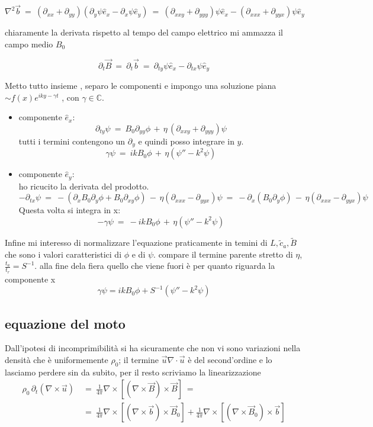 \[\nabla^2\vec b\ =\ (\partial_{xx}+\partial_{yy})(\partial_y\psi\hat e_x-\partial_x\psi\hat e_y)\ =\ (\partial_{xxy}+\partial_{yyy})\psi\hat e_x-(\partial_{xxx}+\partial_{yyx})\psi\hat e_y\] 

chiaramente la derivata rispetto al tempo del campo elettrico mi ammazza il campo medio $B_0$ 

\[\partial_t\vec B\ =\ \partial _t\vec b\ =\ \partial_{ty}\psi\hat e_x-\partial_{tx}\psi\hat e_y\]

Metto tutto insieme , separo le componenti e impongo una soluzione piana $\sim f(x)e^{iky-\gamma t}$ , con $\gamma \in \mathbb C$.

\begin{itemize}
	\item componente $\hat e_x$:\[ \partial_{ty}\psi\ =\ B_0\partial_{yy}\phi\,+\,\eta\,(\partial_{xxy}+\partial_{yyy})\psi\] tutti i termini contengono un $\partial _y$ e quindi posso integrare in $y$.\\
	\[\gamma\psi\ =\ ikB_0\phi\,+\,\eta(\psi''-k^2\psi)\] 
	\item componente $\hat e_y$:  \\ho ricucito la derivata del prodotto. 
	\[ -\partial_{tx}\psi\ =\ -(\partial_x B_0 \partial_y \phi + B_0 \partial_{xy}\phi) \,-\,\eta(\partial_{xxx}-\partial_{yyx})\psi\ =\ -\partial_x (B_0\partial_y\phi)\,-\,\eta(\partial_{xxx}-\partial_{yyx})\psi\]
	Questa volta si integra in x:
	\[-\gamma\psi\ =\ -ikB_0\phi\,+\,\eta(\psi''-k^2\psi)\]
	
\end{itemize} 

Infine mi interesso di normalizzare l'equazione praticamente in temini di $L,\tilde c_a, \tilde B$ che sono i valori caratteristici di $\phi$ e di $\psi$. compare il termine  parente stretto di $\eta$, $\frac{t_a}{t_r}=S^{-1}$.  
alla fine dela fiera quello che viene fuori è per quanto riguarda la componente x  
\[\gamma\psi=ikB_0\phi+S^{-1}(\psi''-k^2\psi)\] 



%
%
\subsection{equazione del moto } 
Dall'ipotesi di incomprimibilità si ha sicuramente che non vi sono variazioni nella densità che è uniformemente $\rho_0$; il termine $\vec u\nabla\cdot\vec u$ è del second'ordine e lo lasciamo perdere sin da subito, per il resto scriviamo la linearizzazione  
\[ \begin{aligned}
\rho_0\,\partial_t(\nabla\times\vec u)\
&=\ \frac{1}{4\pi}\nabla\times\left[(\nabla\times \vec B)\times\vec B\right]\ =\\ 
&=\ \frac{1}{4\pi}\nabla\times\left[(\nabla\times \vec b)\times\vec B_0\right]+\frac{1}{4\pi}\nabla\times\left[(\nabla\times \vec B_0)\times\vec b\right]
\end{aligned}\]

